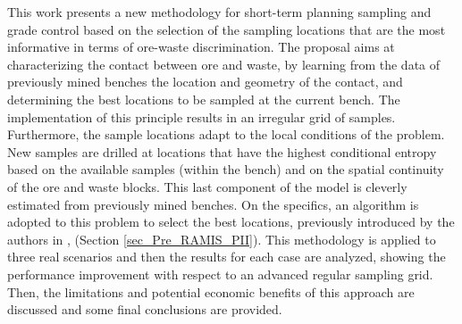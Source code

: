 
This work presents a new methodology for short-term planning sampling and grade control based on the selection of the sampling locations that are the most informative in terms of ore-waste discrimination. The proposal aims at characterizing the contact between ore and waste, by learning from the data of previously mined benches the location and geometry of the contact, and determining the best locations to be sampled at the current bench. The implementation of this principle results in an irregular grid of samples. Furthermore, the sample locations adapt to the local conditions of the problem.  
New samples are drilled at locations that have the highest conditional entropy based on the available samples (within the bench) and on the spatial continuity of the ore and waste blocks. This last component of the model is cleverly estimated from previously mined benches. On the specifics, an algorithm is adopted to this problem to select the best locations, previously introduced by the authors in \cite{Santibanez2019_a}, (Section \ref{sec_Pre_RAMIS_PII}). This methodology is applied to three real scenarios and then the results for each case are analyzed, showing the performance improvement with respect to an advanced regular sampling grid. Then, the limitations and potential economic benefits of this approach are discussed and some final conclusions are provided. 


